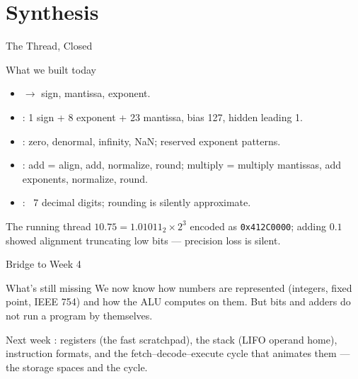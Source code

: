 \documentclass[aspectratio=169]{beamer}
\begin{document}
\section{Synthesis}

\begin{frame}{The Thread, Closed}
  \begin{block}{What we built today}
    \begin{itemize}
      \item {} $\to$ sign, mantissa, exponent.
      \item {}: 1 sign + 8 exponent + 23 mantissa, bias 127,
        hidden leading 1.
      \item {}: zero, denormal, infinity, NaN; reserved
        exponent patterns.
      \item {}: add = align, add, normalize, round; multiply =
        multiply mantissas, add exponents, normalize, round.
      \item {}: ~7 decimal digits; rounding is silently
        approximate.
    \end{itemize}
  \end{block}
  \begin{exampleblock}{The running thread}
    $10.75 = 1.01011_2 \times 2^3$ encoded as \texttt{0x412C0000}; adding
    $0.1$ showed alignment truncating low bits --- precision loss is silent.
  \end{exampleblock}
\end{frame}

\begin{frame}{Bridge to Week 4}
  \begin{block}{What's still missing}
    We now know how numbers are represented (integers, fixed point, IEEE 754)
    and how the ALU computes on them. But bits and adders do not run a program
    by themselves.
  \end{block}
  \begin{exampleblock}{Next week}
    : registers (the fast scratchpad), the stack (LIFO
    operand home), instruction formats, and the fetch--decode--execute cycle
    that animates them --- the storage spaces and the cycle.
  \end{exampleblock}
\end{frame}
\end{document}
